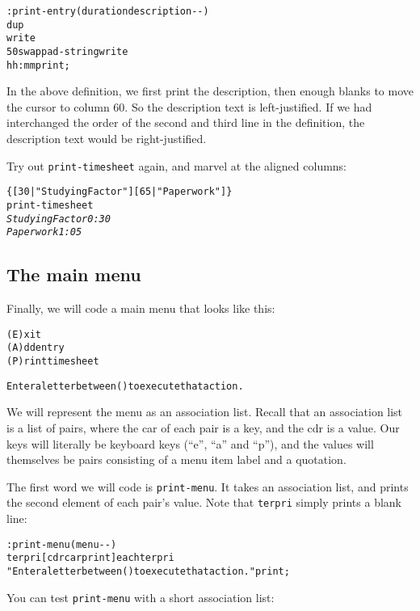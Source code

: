 \documentclass[english]{article}
\begin{document}
{\begin{alltt}
: print-entry ( duration description -{}- )
    dup
    write
    50 swap pad-string write 
    hh:mm print ;
\end{alltt}

In the above definition, we first print the description, then enough
blanks to move the cursor to column 60. So the description text is
left-justified. If we had interchanged the order of the second and
third line in the definition, the description text would be right-justified.

Try out \texttt{print-timesheet} again, and marvel at the aligned
columns:

\begin{alltt}
\{ {[} 30 | "Studying Factor" {]} {[} 65 | "Paperwork" {]} \}
print-timesheet
\emph{Studying Factor                                   0:30}
\emph{Paperwork                                         1:05}
\end{alltt}

\subsection{The main menu}

Finally, we will code a main menu that looks like this:

\begin{alltt}

(E)xit
(A)dd entry
(P)rint timesheet

Enter a letter between ( ) to execute that action.
\end{alltt}

We will represent the menu as an association list. Recall that an association list is a list of pairs, where the car of each pair is a key, and the cdr is a value. Our keys will literally be keyboard keys (``e'', ``a'' and ``p''), and the values will themselves be pairs consisting of a menu item label and a quotation.

The first word we will code is \texttt{print-menu}. It takes an association list, and prints the second element of each pair's value. Note that \texttt{terpri} simply prints a blank line:

\begin{alltt}
: print-menu ( menu -{}- )
    terpri {[} cdr car print {]} each terpri
    "Enter a letter between ( ) to execute that action." print ;
\end{alltt}

You can test \texttt{print-menu} with a short association list:

}
\end{document}
